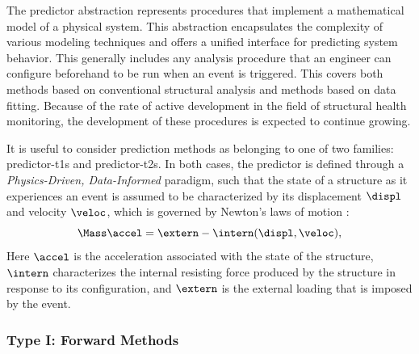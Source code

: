 The \gls{predictor} abstraction represents procedures that implement a mathematical model of a physical system.
This abstraction encapsulates the complexity of various modeling techniques and offers a unified interface for predicting system behavior. 
This generally includes any analysis procedure
that an engineer can configure beforehand to be run when an \gls{event} is triggered. 
This covers both methods based on conventional structural analysis and methods 
based on data fitting.
Because of the rate of active development in the 
 field of structural health monitoring, the development of these procedures is expected to continue growing.
 
It is useful to consider prediction methods as belonging to one of two families: 
\glspl{predictor-t1} and \glspl{predictor-t2}. 
In both cases, the \gls{predictor} is defined through a \emph{Physics-Driven, Data-Informed} 
paradigm, such that 
the state of a structure as it experiences an \gls{event} is assumed to be characterized by its displacement $\displ$ and velocity $\veloc$, which is governed by Newton's laws of motion \cite{arnold1978mathematical}:
\begin{equation}
    \Mass \accel = \extern -  \intern(\displ,\veloc), %
    \label{eq:newton-discrete}
\end{equation}
Here $\accel$ is the acceleration associated with the state of the structure, $\intern$ characterizes the internal resisting force produced by the structure in response to its configuration, and $\extern$ is the external loading that is imposed by the \gls{event}. 

\subsubsection{Type I: Forward Methods}

